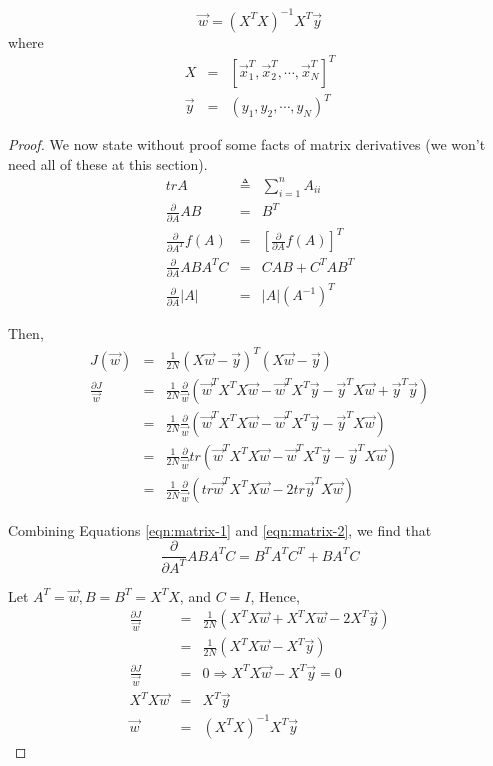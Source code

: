 \begin{equation}
\vec{w}=(X^TX)^{-1}X^T\vec{y}
\end{equation}
where
\begin{eqnarray*}
X &=& \left[\vec{x}_1^T,\vec{x}_2^T,\cdots,\vec{x}_N^T\right]^T \\
\vec{y} &=& (y_1,y_2,\cdots,y_N)^T
\end{eqnarray*}


\begin{proof}
We now state without proof some facts of matrix derivatives (we won’t need all of these at this section).
\begin{eqnarray}
trA &\triangleq& \sum\limits_{i=1}^n A_{ii} \nonumber \\
\frac{\partial}{\partial A}AB &=& B^T \\
\frac{\partial}{\partial A^T}f(A) &=& \left[\frac{\partial}{\partial A}f(A)\right]^T \label{eqn:matrix-1} \\
\frac{\partial}{\partial A}ABA^TC &=& CAB+C^TAB^T \label{eqn:matrix-2} \\
\frac{\partial}{\partial A}|A| &=& |A|(A^{-1})^T
\end{eqnarray}

Then,
\begin{eqnarray*}
J(\vec{w}) &=& \frac{1}{2N}(X\vec{w}-\vec{y})^T(X\vec{w}-\vec{y}) \\
\frac{\partial J}{\vec{w}} &=& \frac{1}{2N} \frac{\partial}{\vec{w}} (\vec{w}^TX^TX\vec{w}-\vec{w}^TX^T\vec{y}-\vec{y}^TX\vec{w}+\vec{y}^T\vec{y}) \\
                           &=& \frac{1}{2N} \frac{\partial}{\vec{w}} (\vec{w}^TX^TX\vec{w}-\vec{w}^TX^T\vec{y}-\vec{y}^TX\vec{w}) \\
						   &=& \frac{1}{2N} \frac{\partial}{\vec{w}} tr(\vec{w}^TX^TX\vec{w}-\vec{w}^TX^T\vec{y}-\vec{y}^TX\vec{w}) \\
						   &=& \frac{1}{2N} \frac{\partial}{\vec{w}} (tr\vec{w}^TX^TX\vec{w}-2tr\vec{y}^TX\vec{w})
\end{eqnarray*}

Combining Equations \eqref{eqn:matrix-1} and \eqref{eqn:matrix-2}, we find that 
\begin{equation*}
\frac{\partial}{\partial A^T}ABA^TC = B^TA^TC^T+BA^TC
\end{equation*}

Let $A^T=\vec{w}, B=B^T=X^TX$, and $C=I$, Hence,
\begin{eqnarray*}
\frac{\partial J}{\vec{w}} &=& \frac{1}{2N} (X^TX\vec{w}+X^TX\vec{w} -2X^T\vec{y}) \\
						   &=& \frac{1}{2N} (X^TX\vec{w} - X^T\vec{y}) \\
\frac{\partial J}{\vec{w}} &=& 0 \Rightarrow X^TX\vec{w} - X^T\vec{y} =0 \\
X^TX\vec{w} &=& X^T\vec{y} \\
\vec{w} &=& (X^TX)^{-1}X^T\vec{y}
\end{eqnarray*}
\end{proof}


